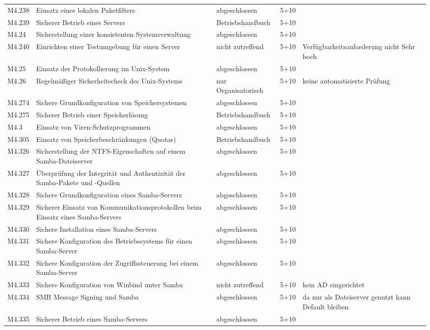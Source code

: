 \begin{longtable}{lp{3.7cm}|p{3cm}l|p{3.8cm}}
M4.238 & Einsatz eines lokalen Paketfilters & abgeschlossen & 5+10 &  \\
M4.239 & Sicherer Betrieb eines Servers & Betriebshandbuch & 5+10 &  \\
M4.24 & Sicherstellung einer konsistenten Systemverwaltung & abgeschlossen & 5+10 &  \\
M4.240 & Einrichten einer Testumgebung für einen Server & nicht zutreffend & 5+10 & Verfügbarkeitsanforderung nicht Sehr hoch \\
M4.25 & Einsatz der Protokollierung im Unix-System & abgeschlossen & 5+10 &  \\
M4.26 & Regelmäßiger Sicherheitscheck des Unix-Systems & nur Organisatorisch & 5+10 & keine automatisierte Prüfung \\
M4.274 & Sichere Grundkonfiguration von Speichersystemen & abgeschlossen & 5+10 &  \\
M4.275 & Sicherer Betrieb einer Speicherlösung & Betriebshandbuch & 5+10 &  \\
M4.3 & Einsatz von Viren-Schutzprogrammen & abgeschlossen & 5+10 &  \\
M4.305 & Einsatz von Speicherbeschränkungen (Quotas) & Betriebshandbuch & 5+10 &  \\
M4.326 & Sicherstellung der NTFS-Eigenschaften auf einem Samba-Dateiserver & abgeschlossen & 5+10 &  \\
M4.327 & Überprüfung der Integrität und Authentizität der Samba-Pakete und -Quellen & abgeschlossen & 5+10 &  \\
M4.328 & Sichere Grundkonfiguration eines Samba-Servers & abgeschlossen & 5+10 &  \\
M4.329 & Sicherer Einsatz von Kommunikationsprotokollen beim Einsatz eines Samba-Servers & abgeschlossen & 5+10 &  \\
M4.330 & Sichere Installation eines Samba-Servers & abgeschlossen & 5+10 &  \\
M4.331 & Sichere Konfiguration des Betriebssystems für einen Samba-Server & abgeschlossen & 5+10 &  \\
M4.332 & Sichere Konfiguration der Zugriffssteuerung bei einem Samba-Server & abgeschlossen & 5+10 &  \\
M4.333 & Sichere Konfiguration von Winbind unter Samba & nicht zutreffend & 5+10 & kein AD eingerichtet \\
M4.334 & SMB Message Signing und Samba & abgeschlossen & 5+10 & da nur als Dateiserver genutzt kann Default bleiben \\
M4.335 & Sicherer Betrieb eines Samba-Servers & abgeschlossen & 5+10 &  \\

\end{longtable}
